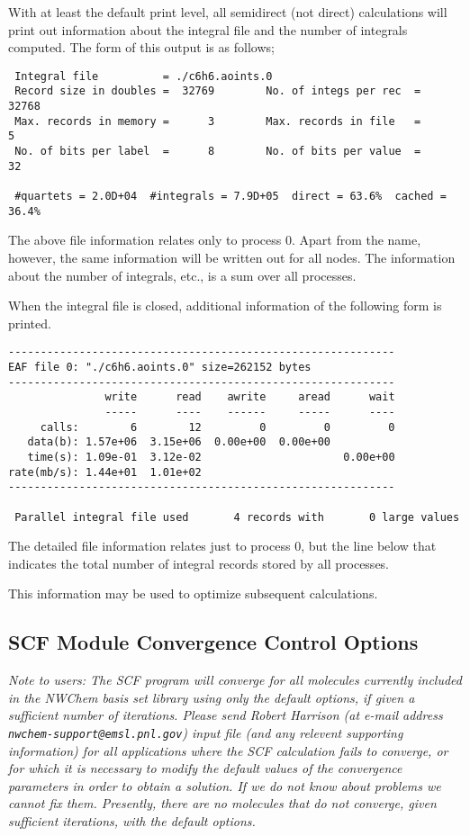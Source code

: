 With at least the default print level, all semidirect (not direct)
calculations will print out information about
the integral file and the number of integrals computed.  The form of this
output is as follows;

\begin{verbatim}
 Integral file          = ./c6h6.aoints.0
 Record size in doubles =  32769        No. of integs per rec  =  32768
 Max. records in memory =      3        Max. records in file   =      5
 No. of bits per label  =      8        No. of bits per value  =     32

 #quartets = 2.0D+04  #integrals = 7.9D+05  direct = 63.6%  cached = 36.4%
\end{verbatim}

The above file information relates only to process 0.  Apart from the
name, however, the same information will be written out for all nodes.  
The information about the number
of integrals, etc., is a sum over all processes.

When the integral file is closed, additional information of the following
form is printed.

\begin{verbatim}
------------------------------------------------------------
EAF file 0: "./c6h6.aoints.0" size=262152 bytes
------------------------------------------------------------
               write      read    awrite     aread      wait
               -----      ----    ------     -----      ----
     calls:        6        12         0         0         0
   data(b): 1.57e+06  3.15e+06  0.00e+00  0.00e+00
   time(s): 1.09e-01  3.12e-02                      0.00e+00
rate(mb/s): 1.44e+01  1.01e+02
------------------------------------------------------------

 Parallel integral file used       4 records with       0 large values
\end{verbatim}
The detailed file information relates just to process 0, but the 
line below that indicates the total number of integral records stored
by all processes.  

This information may be used to optimize subsequent calculations.


\subsection{SCF Module Convergence Control Options}
\label{sec:scfconv}

{\em Note to users: The SCF program will converge for all molecules
  currently included in the NWChem basis set library using only the default
  options, if given a sufficient number of iterations.  Please send
  Robert Harrison (at e-mail address \verb+nwchem-support@emsl.pnl.gov+)
  input file (and any relevent supporting information) for all applications
  where the SCF calculation fails to converge, or for which it is necessary
  to modify the default values of the convergence parameters in order to
  obtain a solution.  If we
  do not know about problems we cannot fix them.  Presently, there are
  no molecules that do not converge, given sufficient iterations, with
  the default options.}

